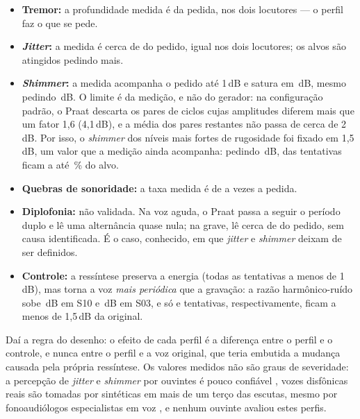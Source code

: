 				\begin{itemize}
					\item \textbf{Tremor:} a profundidade medida é  da pedida, nos dois locutores --- o perfil faz o que se pede.
					\item \textbf{\textit{Jitter}:} a medida é cerca de  do pedido, igual nos dois locutores; os alvos são atingidos pedindo mais.
					\item \textbf{\textit{Shimmer}:} a medida acompanha o pedido até 1\,dB e satura em \,dB, mesmo pedindo \,dB. O limite é da medição, e não do gerador: na configuração padrão, o Praat descarta os pares de ciclos cujas amplitudes diferem mais que um fator 1,6 (4,1\,dB), e a média dos pares restantes não passa de cerca de 2\,dB. Por isso, o \textit{shimmer} dos níveis mais fortes de rugosidade foi fixado em 1,5\,dB, um valor que a medição ainda acompanha: pedindo \,dB,  das  tentativas ficam a até \,\% do alvo.
					\item \textbf{Quebras de sonoridade:} a taxa medida é de  a  vezes a pedida.
					\item \textbf{Diplofonia:} não validada. Na voz aguda, o Praat passa a seguir o período duplo e lê uma alternância quase nula; na grave, lê cerca de  do pedido, sem causa identificada. É o caso, conhecido, em que \textit{jitter} e \textit{shimmer} deixam de ser definidos.
					\item \textbf{Controle:} a ressíntese preserva a energia (todas as tentativas a menos de 1\,dB), mas torna a voz \emph{mais periódica} que a gravação: a razão harmônico-ruído sobe \,dB em S10 e \,dB em S03, e só  e  tentativas, respectivamente, ficam a menos de 1,5\,dB da original.
				\end{itemize}
				Daí a regra do desenho: o efeito de cada perfil é a diferença entre o perfil e o controle, e nunca entre o perfil e a voz original, que teria embutida a mudança causada pela própria ressíntese. Os valores medidos não são graus de severidade: a percepção de \textit{jitter} e \textit{shimmer} por ouvintes é pouco confiável \cite{kreiman2005perception}, vozes disfônicas reais são tomadas por sintéticas em mais de um terço das escutas, mesmo por fonoaudiólogos especialistas em voz \cite{englert2017perceptual}, e nenhum ouvinte avaliou estes perfis.

